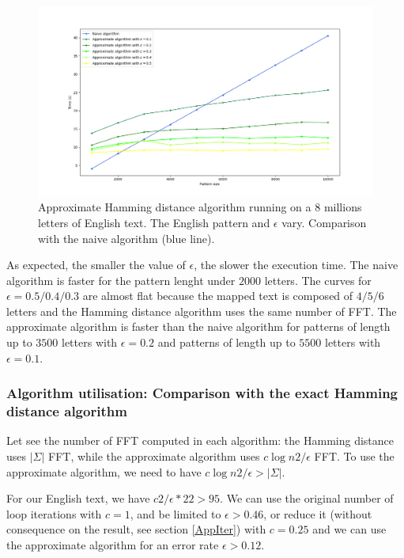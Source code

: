 \documentclass[preprint,12pt]{elsarticle}
\begin{document}
\begin{figure}[h]
\includegraphics[scale=0.45]{./figures/appHDTempsError.png}
\caption{Approximate Hamming distance algorithm running on a $8$ millions letters of English text.
The English pattern and $\epsilon$ vary.
Comparison with the naive algorithm (blue line).}
\label{AppHDTempsErr}
\end{figure}

As expected, the smaller the value of $\epsilon$, the slower the execution time.
The naive algorithm is faster for the pattern lenght under $2000$ letters.
The curves for $\epsilon = 0.5 / 0.4 / 0.3$ are almost flat
because the mapped text is composed of $4 / 5 / 6$ letters
and the Hamming distance algorithm uses the same number of FFT.
The approximate algorithm is faster than the naive algorithm
for patterns of length up to $3500$ letters with $\epsilon = 0.2$
and patterns of length up to $5500$ letters with $\epsilon = 0.1$.



\subsubsection{Algorithm utilisation: Comparison with the exact Hamming distance algorithm}


Let see the number of FFT computed in each algorithm:
the Hamming distance uses $|\Sigma|$ FFT,
while the approximate algorithm uses $c \log n 2/\epsilon$ FFT.
To use the approximate algorithm, we need to have $c \log n 2/\epsilon > |\Sigma|$. 

For our English text, we have $c 2/\epsilon * 22 > 95$.
We can use the original number of loop iterations with $c = 1$,
and be limited to $\epsilon > 0.46$,
or reduce it (without consequence on the result, see section \ref{AppIter})
with $c = 0.25$ and we can use the approximate algorithm for an error rate $\epsilon > 0.12$.
\end{document}
